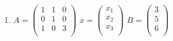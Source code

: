 \documentclass[10pt,]{book}
\theoremstyle{plain}
\theoremstyle{definition}
\theoremstyle{definition}
\theoremstyle{definition}
\theoremstyle{definition}
\begin{document}
\begin{exercisegroup}
\begin{enumerate}[label=\alph*]
%
\item\hypertarget{li-43}{}   \(A=\left(
\begin{array}{ccc}
 1 & 1 & 0 \\
 0 & 1 & 0 \\
 1 & 0 & 3 \\
\end{array}
\right)\)  \(x=\left(
\begin{array}{c}
 x_1 \\
 x_2 \\
 x_3 \\
\end{array}
\right)\)    \(B=\left(
\begin{array}{c}
 3 \\
 5 \\
 6 \\
\end{array}
\right)\)
%
\end{enumerate}
%
\end{exercisegroup}
\par\smallskip\noindent
\typeout{************************************************}
\typeout{************************************************}
\end{document}
